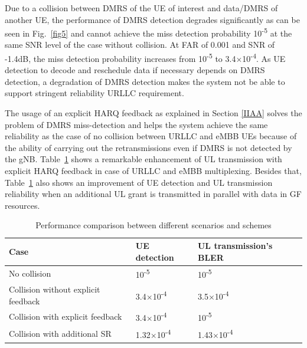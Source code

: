 \documentclass[conference]{IEEEtran}
\begin{document}
Due to a collision between DMRS of the UE of interest and data/DMRS of another UE, the performance of DMRS detection degrades significantly as can be seen in Fig.~\ref{fig5} and cannot achieve the miss detection probability 10\textsuperscript{-5} at the same SNR level of the case without collision. At FAR of 0.001 and SNR of -1.4dB, the miss detection probability increases from 10\textsuperscript{-5} to 3.4$\times$10\textsuperscript{-4}. As UE detection to decode and reschedule data if necessary depends on DMRS detection, a degradation of DMRS detection makes the system not be able to support stringent reliability URLLC requirement.

The usage of an explicit HARQ feedback as explained in Section \ref{IIAA} solves the problem of DMRS miss-detection and helps the system achieve the same reliability as the case of no collision between URLLC and eMBB UEs because of the ability of carrying out the retransmissions even if DMRS is not detected by the gNB. Table~\ref{tab2} shows a remarkable enhancement of UL transmission with explicit HARQ feedback in case of URLLC and eMBB multiplexing. Besides that, Table~\ref{tab2} also shows an improvement of UE detection and UL transmission reliability when an additional UL grant is transmitted in parallel with data in GF resources.
 

\begin{table}[htbp]
\caption{Performance comparison between different scenarios and schemes}
\begin{center}
\begin{tabular}{|p{8em}|p{8em}|p{8em}|}
 \hline
 \textbf{Case} & \textbf{UE detection}& \textbf{UL transmission's BLER}\\
 \hline
 No collision & 10\textsuperscript{-5}&10\textsuperscript{-5}\\
 \hline
 Collision without explicit feedback & 3.4$\times$10\textsuperscript{-4}&3.5$\times$10\textsuperscript{-4}\\
 \hline
 Collision with explicit feedback& 3.4$\times$10\textsuperscript{-4}&10\textsuperscript{-5}\\
\hline
 Collision with additional SR& 1.32$\times$10\textsuperscript{-4}&1.43$\times$10\textsuperscript{-4}\\

 
 \hline
\end{tabular}
\label{tab2}
\end{center}
\end{table}
\end{document}
